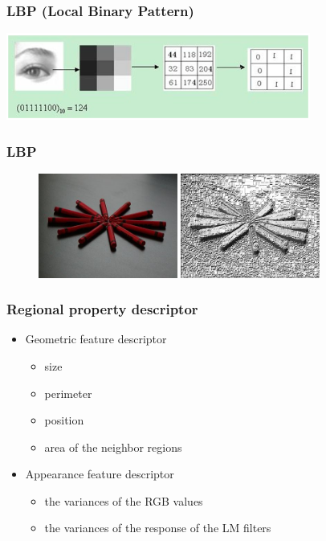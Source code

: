 \documentclass[notheorems,serif,table,compress]{beamer}  %
\begin{document}
\begin{frame}
\frametitle{LBP (Local Binary Pattern)}
\centering\includegraphics[width=10cm]{LBP.png}
\end{frame}


\begin{frame}
\frametitle{LBP}
  \begin{figure}[!ht]
  \begin{minipage}[t]{0.46\textwidth}
  \includegraphics[width=1.8in]{example1.jpg}
  \end{minipage}
  \begin{minipage}[t]{0.46\textwidth}
  \includegraphics[width=1.8in]{LBP1.png}
  \end{minipage}
  \end{figure} 
\end{frame}


\begin{frame}
\frametitle{ Regional property descriptor}
\begin{itemize}
\item Geometric feature descriptor 
\begin{itemize}
\item size
\item perimeter
\item position
\item area of the neighbor regions
\end{itemize}
\item Appearance feature descriptor
\begin{itemize}
\item the variances of the RGB values
\item the variances of the response of the LM filters
\end{itemize}
\end{itemize}
\end{frame}
\end{document}
